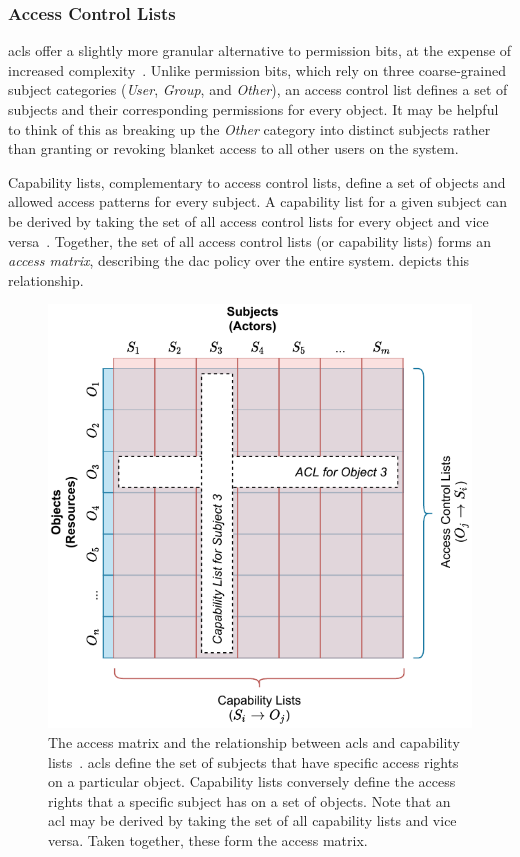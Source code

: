\subsubsection*{Access Control Lists}

\Glspl{acl} offer a slightly more granular alternative to permission bits,
at the expense of increased complexity~\cite{jaeger2008_os_security,
van_oorschot2020_tools_jewels}. Unlike permission bits, which rely on three coarse-grained
subject categories (\textit{User}, \textit{Group}, and \textit{Other}), an access control
list defines a set of subjects and their corresponding permissions for every object. It
may be helpful to think of this as breaking up the \textit{Other} category into distinct
subjects rather than granting or revoking blanket access to all other users on the system.

Capability lists, complementary to access control lists, define a set of objects and
allowed access patterns for every subject. A capability list for a given subject can be
derived by taking the set of all access control lists for every object and vice
versa~\cite{van_oorschot2020_tools_jewels}. Together, the set of all access control lists
(or capability lists) forms an \textit{access matrix}, describing the \gls{dac} policy over
the entire system.  depicts this relationship.

\begin{figure}[htbp]
  \centering
  \includegraphics[width=0.8\linewidth]{figs/background/acl.pdf}
  \caption[The access matrix]{
    The access matrix and the relationship between \glspl{acl} and capability
    lists~\cite{anderson1972_report, van_oorschot2020_tools_jewels,
    jaeger2008_os_security}. \glspl{acl} define the set of subjects that have specific
    access rights on a particular object. Capability lists conversely define the access
    rights that a specific subject has on a set of objects. Note that an \gls{acl} may be
    derived by taking the set of all capability lists and vice versa. Taken together,
    these form the access matrix.
  }%
  \label{fig:acl}
\end{figure}

